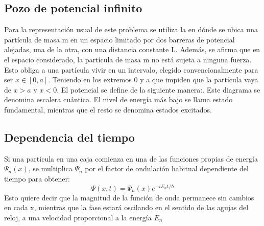 \documentclass[12pt,twoside]{extarticle}
\begin{document}
\subsection{Pozo de potencial infinito}
\noindent Para la representación usual de este problema se utiliza la en dónde se ubica una partícula de masa m en un espacio limitado por dos barreras de potencial alejadas, una de la otra, con una distancia constante L. Además, se afirma que en el espacio considerado, la partícula de masa m no está sujeta a ninguna fuerza. Esto obliga a una partícula vivir en un intervalo, elegido convencionalmente para ser $x\in [0, a]$. Teniendo en los extremos 0 y a que impiden que la partícula vaya de $x>a$ y $x<0$. El potencial se define de la siguiente manera:.
Este diagrama se denomina escalera cuántica. El nivel de energía más bajo se llama estado fundamental, mientras que el resto se denomina estados excitados.

\subsection{Dependencia del tiempo}
Si una partícula en una caja comienza en una de las funciones propias de energía $\Psi_n(x)$, se multiplica $\Psi_n$ por el factor de ondulación habitual dependiente del tiempo para obtener:
\begin{equation}
    \Psi(x, t)=\Psi_n(x)e^{-iE_nt/\hbar}
\end{equation}
Esto quiere decir que la magnitud de la función de onda permanece sin cambios en cada x, mientras que la fase estará oscilando en el sentido de las agujas del reloj, a una velocidad proporcional a la energía $E_n$
\end{document}
